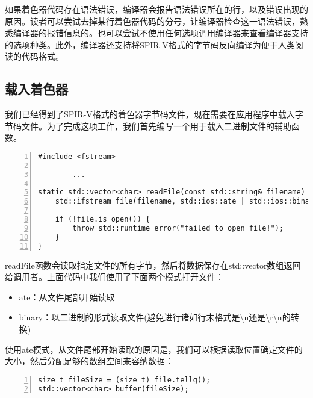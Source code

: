\documentclass{ctexart}
\begin{document}
如果着色器代码存在语法错误，编译器会报告语法错误所在的行，以及错误出现的原因。读者可以尝试去掉某行着色器代码的分号，让编译器检查这一语法错误，熟悉编译器的报错信息的。也可以尝试不使用任何选项调用编译器来查看编译器支持的选项种类。此外，编译器还支持将SPIR-V格式的字节码反向编译为便于人类阅读的代码格式。

\subsection{载入着色器}

我们已经得到了SPIR-V格式的着色器字节码文件，现在需要在应用程序中载入字节码文件。为了完成这项工作，我们首先编写一个用于载入二进制文件的辅助函数。

\begin{lstlisting}[language={[ANSI]C},keywordstyle=\color{blue!70},commentstyle=\color{red!50!green!50!blue!50},frame=shadowbox, rulesepcolor=\color{red!20!green!20!blue!20},basicstyle=\small,numbers=left, numberstyle=\tiny,breaklines=true]
#include <fstream>

		...

static std::vector<char> readFile(const std::string& filename) {
	std::ifstream file(filename, std::ios::ate | std::ios::binary);

	if (!file.is_open()) {
		throw std::runtime_error("failed to open file!");
	}
}
\end{lstlisting}

readFile函数会读取指定文件的所有字节，然后将数据保存在std::vector数组返回给调用者。上面代码中我们使用了下面两个模式打开文件：

\begin{itemize}
	\item ate：从文件尾部开始读取
	\item binary：以二进制的形式读取文件(避免进行诸如行末格式是\textbackslash n还是\textbackslash r\textbackslash n的转换)
\end{itemize}

使用ate模式，从文件尾部开始读取的原因是，我们可以根据读取位置确定文件的大小，然后分配足够的数组空间来容纳数据：

\begin{lstlisting}[language={[ANSI]C},keywordstyle=\color{blue!70},commentstyle=\color{red!50!green!50!blue!50},frame=shadowbox, rulesepcolor=\color{red!20!green!20!blue!20},basicstyle=\small,numbers=left, numberstyle=\tiny,breaklines=true]
size_t fileSize = (size_t) file.tellg();
std::vector<char> buffer(fileSize);
\end{lstlisting}
\end{document}
